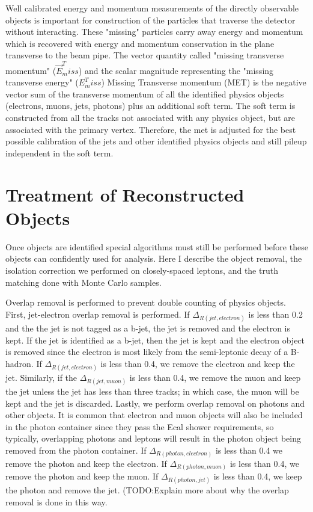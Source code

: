 Well calibrated energy and momentum measurements of the directly observable objects is important for construction of the particles that traverse the detector without interacting.  These "missing" particles carry away energy and momentum which is recovered with energy and momentum conservation in the plane transverse to the beam pipe.  The vector quantity called "missing transverse momentum" ($\vec{E}^T_miss$) and the scalar magnitude representing the "missing transverse energy" ($E^T_miss$) 
Missing Transverse momentum (MET) is the negative vector sum of the transverse momentum of all the identified physics objects (electrons, muons, jets, photons) plus an additional soft term.  The soft term is constructed from all the tracks not associated with any physics object, but are associated with the primary vertex.  Therefore, the met is adjusted for the best possible calibration of the jets and other identified physics objects and still pileup independent in the soft term. 

\section{Treatment of Reconstructed Objects}

Once objects are identified special algorithms must still be performed before these objects can confidently used for analysis.  Here I describe the object removal, the isolation correction we performed on closely-spaced leptons, and the truth matching done with Monte Carlo samples.

Overlap removal is performed to prevent double counting of physics objects. First, jet-electron overlap removal is performed.  If $\Delta_{R(jet, electron)}$ is less than 0.2 and the the jet is not tagged as a b-jet, the jet is removed and the electron is kept.  If the jet is identified as a b-jet, then the jet is kept and the electron object is removed since the electron is most likely from the semi-leptonic decay of a B-hadron.  If $\Delta_{R(jet, electron)}$ is less than 0.4, we remove the electron and keep the jet.  Similarly, if the $\Delta_{R(jet, muon)}$ is less than 0.4, we remove the muon and keep the jet unless the jet has less than three tracks; in which case, the muon will be kept and the jet is discarded.  Lastly, we perform overlap removal on photons and other objects.  It is common that electron and muon objects will also be included in the photon container since they pass the Ecal shower requirements, so typically, overlapping photons and leptons will result in the photon object being removed from the photon container.  If $\Delta_{R(photon, electron)}$ is less than 0.4 we remove the photon and keep the electron.  If $\Delta_{R(photon, muon)}$ is less than 0.4, we remove the photon and keep the muon.  If $\Delta_{R(photon, jet)}$ is less than 0.4, we keep the photon and remove the jet.  (TODO:Explain more about why the overlap removal is done in this way.


